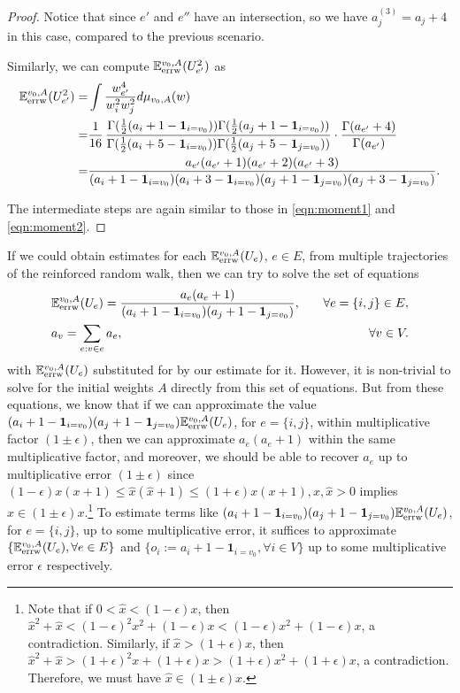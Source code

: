 \documentclass[a4paper, 11pt]{article}
\newcommand{\E}{\mathbb{E}}
\newcommand{\Eerrw}{\E_{\textnormal{errw}}}
\newcommand{\ind}{\mathbf{1}}
\begin{document}
\begin{proof}
Notice that since $e'$ and $e''$ have an intersection, so we have $a_j^{(3)}=a_j+4$ in this case, compared to the previous scenario. 

Similarly, we can compute $\Eerrw^{v_0,A}(U_{e'}^2)$ as
\begin{align}
\label{eqn:moment6}
\Eerrw^{v_0,A}(U_{e'}^2)
=& \int \frac{w_{e'}^4}{w_i^2w_j^2} d\mu_{v_0,A}(w) \nonumber \\
=& \frac{1}{16}\, \frac{\Gamma(\frac{1}{2}(a_i+1-\ind_{i=v_0}))\Gamma(\frac{1}{2}(a_j+1-\ind_{i=v_0}))}{\Gamma(\frac{1}{2}(a_i+5-\ind_{i=v_0}))\Gamma(\frac{1}{2}(a_j+5-\ind_{j=v_0}))}\cdot \frac{\Gamma(a_{e'}+4)}{\Gamma(a_{e'})}\nonumber \\
=& \frac{a_{e'}(a_{e'}+1)(a_{e'}+2)(a_{e'}+3)}{(a_i+1-\ind_{i=v_0})(a_i+3-\ind_{i=v_0})(a_j+1-\ind_{j=v_0})(a_j+3-\ind_{j=v_0})}.
\end{align}

The intermediate steps are again similar to those in \cref{eqn:moment1} and \cref{eqn:moment2}.
\end{proof}

If we could obtain estimates for each $\Eerrw^{v_0,A}(U_e)$, $e \in E$, from multiple trajectories of the reinforced random walk, then we can try to solve the set of equations
\begin{equation*}
\begin{aligned}
&\Eerrw^{v_0,A} (U_e)=\frac{a_e(a_e+1)}{(a_i+1-\ind_{i=v_0})(a_j+1-\ind_{j=v_0})}, \quad& \forall e = \{i,j\} \in E,\\
&a_v=\sum_{e:v\in e} a_e, \quad& \forall v\in V.
\end{aligned} 
\end{equation*}
with $\Eerrw^{v_0,A}(U_e)$ substituted for by our estimate for it. However, it is non-trivial to solve for the initial weights $A$ directly from this set of equations. But from these equations, we know that if we can approximate the value $(a_i+1-\ind_{i=v_0})(a_j+1-\ind_{j=v_0})\Eerrw^{v_0, A} (U_e)$, for
$e = \{i,j\}$, within multiplicative factor $(1\pm \epsilon)$, then we can approximate $a_e(a_e+1)$ within the same multiplicative factor, and moreover, we should be able to recover $a_e$ up to multiplicative error $(1\pm \epsilon)$ since $(1-\epsilon)x(x+1)\leq \hat{x}(\hat{x}+1)\leq (1+\epsilon)x(x+1), x,\hat{x}> 0$ implies $\hat{x}\in (1\pm\epsilon)x$.\footnote{
Note that if $0<\hat{x}< (1-\epsilon)x$, then $\hat{x}^2+\hat{x}< (1-\epsilon)^2x^2+(1-\epsilon)x 
<(1-\epsilon)x^2+(1-\epsilon)x$, a contradiction. Similarly, if $\hat{x}>(1+\epsilon)x$, then $\hat{x}^2+\hat{x}>(1+\epsilon)^2x+(1+\epsilon)x>(1+\epsilon)x^2+(1+\epsilon)x$, a contradiction. Therefore, we must have $\hat{x}\in(1\pm\epsilon)x$. } To estimate terms like $(a_i+1-\ind_{i=v_0})(a_j+1-\ind_{j=v_0})\Eerrw^{v_0, A} (U_e)$, for $e = \{i,j\}$, up to some multiplicative error, it suffices to approximate $\{\Eerrw^{v_0,A}(U_e), \forall e\in E\}$ and $\{o_i:=a_i+1-\ind_{i=v_0}, \forall i \in V\}$ up to some multiplicative error $\epsilon$ respectively. 
\end{document}
